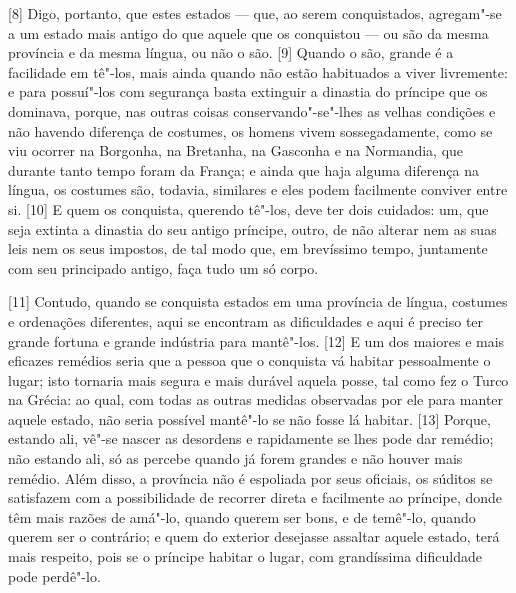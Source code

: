 {[}8{]} Digo, portanto, que estes estados --- que, ao serem conquistados,
agregam"-se a um estado mais antigo do que aquele que os conquistou --- ou
são da mesma província e da mesma língua, ou não o são. {[}9{]} Quando o
são, grande é a facilidade em tê"-los, mais ainda quando não estão
habituados a viver livremente: e para possuí"-los com segurança basta
extinguir a dinastia do príncipe que os dominava, porque, nas outras
coisas conservando"-se"-lhes as velhas condições e não havendo diferença
de costumes, os homens vivem sossegadamente, como se viu ocorrer na
Borgonha, na Bretanha, na Gasconha e na Normandia, que durante tanto
tempo foram da França; e ainda que haja alguma diferença na língua, os
costumes são, todavia, similares e eles podem facilmente conviver entre
si. {[}10{]} E quem os conquista, querendo tê"-los, deve ter dois
cuidados: um, que seja extinta a dinastia do seu antigo príncipe, outro,
de não alterar nem as suas leis nem os seus impostos, de tal modo que, em brevíssimo tempo,
juntamente com seu principado antigo, faça tudo um só corpo.

{[}11{]} Contudo, quando se conquista estados em uma província de
língua, costumes e ordenações diferentes, aqui se encontram as
dificuldades e aqui é preciso ter grande fortuna e grande indústria para
mantê"-los. {[}12{]} E um dos maiores e mais eficazes remédios seria que
a pessoa que o conquista vá habitar pessoalmente o lugar; isto tornaria
mais segura e mais durável aquela posse, tal como fez o Turco na Grécia: ao qual, com todas
as outras medidas observadas por ele
para manter aquele estado, não seria possível mantê"-lo se não fosse lá
habitar. {[}13{]} Porque, estando ali, vê"-se nascer as desordens e
rapidamente se lhes pode dar remédio; não estando ali, só as percebe
quando já forem grandes e não houver mais remédio. Além disso, a
província não é espoliada por seus oficiais, os súditos se satisfazem
com a possibilidade de recorrer direta e facilmente ao príncipe, donde
têm mais razões de amá"-lo, quando querem ser bons, e de temê"-lo, quando
querem ser o contrário; e quem do exterior desejasse assaltar aquele
estado, terá mais respeito, pois se o príncipe habitar o lugar, com
grandíssima dificuldade pode perdê"-lo.

